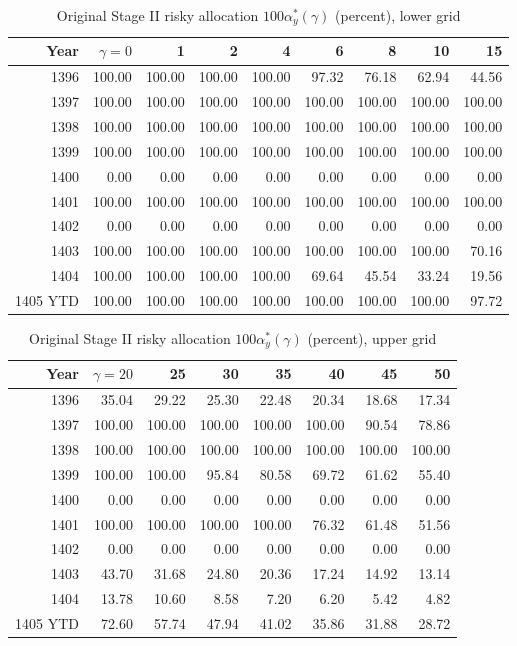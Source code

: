 \documentclass[11pt,a4paper]{article}
\begin{document}
\begin{landscape}
\begin{table}[p]
\centering
\scriptsize
\caption{Original Stage II risky allocation $100\alpha_y^*(\gamma)$ (percent), lower grid}
\begin{tabular}{rrrrrrrrr}
\toprule
Year & $\gamma=0$ & 1 & 2 & 4 & 6 & 8 & 10 & 15 \\
\midrule
1396 & 100.00&100.00&100.00&100.00&97.32&76.18&62.94&44.56\\
1397 & 100.00&100.00&100.00&100.00&100.00&100.00&100.00&100.00\\
1398 & 100.00&100.00&100.00&100.00&100.00&100.00&100.00&100.00\\
1399 & 100.00&100.00&100.00&100.00&100.00&100.00&100.00&100.00\\
1400 & 0.00&0.00&0.00&0.00&0.00&0.00&0.00&0.00\\
1401 & 100.00&100.00&100.00&100.00&100.00&100.00&100.00&100.00\\
1402 & 0.00&0.00&0.00&0.00&0.00&0.00&0.00&0.00\\
1403 & 100.00&100.00&100.00&100.00&100.00&100.00&100.00&70.16\\
1404 & 100.00&100.00&100.00&100.00&69.64&45.54&33.24&19.56\\
1405 YTD & 100.00&100.00&100.00&100.00&100.00&100.00&100.00&97.72\\
\bottomrule
\end{tabular}
\end{table}

\begin{table}[p]
\centering
\scriptsize
\caption{Original Stage II risky allocation $100\alpha_y^*(\gamma)$ (percent), upper grid}
\begin{tabular}{rrrrrrrr}
\toprule
Year & $\gamma=20$ & 25 & 30 & 35 & 40 & 45 & 50 \\
\midrule
1396 & 35.04&29.22&25.30&22.48&20.34&18.68&17.34\\
1397 & 100.00&100.00&100.00&100.00&100.00&90.54&78.86\\
1398 & 100.00&100.00&100.00&100.00&100.00&100.00&100.00\\
1399 & 100.00&100.00&95.84&80.58&69.72&61.62&55.40\\
1400 & 0.00&0.00&0.00&0.00&0.00&0.00&0.00\\
1401 & 100.00&100.00&100.00&100.00&76.32&61.48&51.56\\
1402 & 0.00&0.00&0.00&0.00&0.00&0.00&0.00\\
1403 & 43.70&31.68&24.80&20.36&17.24&14.92&13.14\\
1404 & 13.78&10.60&8.58&7.20&6.20&5.42&4.82\\
1405 YTD & 72.60&57.74&47.94&41.02&35.86&31.88&28.72\\
\bottomrule
\end{tabular}
\end{table}
\end{landscape}
\end{document}
